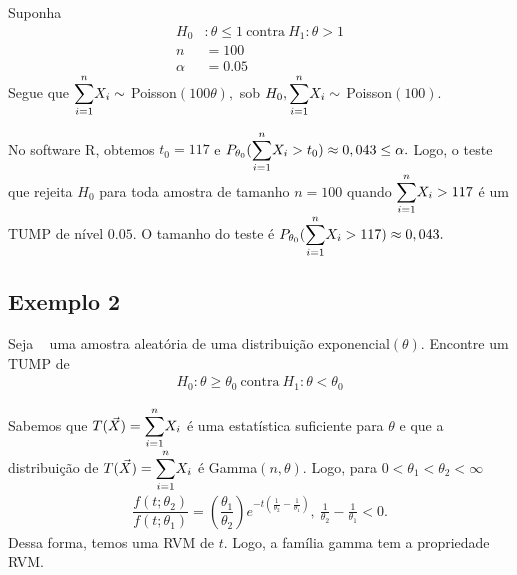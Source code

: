 \documentclass[12pt]{beamer}
\begin{document}
\begin{frame}{}
\begin{block}{}
\justifying
Suponha 
\begin{align*}
    H_{0}&:\theta\leq 1~\text{contra}~H_{1}:\theta> 1\\
    n&=100\\
    \alpha&=0.05
\end{align*}
Segue que ${\displaystyle \sum_{i=1}^{n}} X_{i}\sim~$Poisson$(100\theta),$ sob $H_{0}, {\displaystyle \sum_{i=1}^{n}} X_{i}\sim~$Poisson$(100).$
\end{block}
\end{frame}

\begin{frame}{}
\begin{block}{}
\justifying
No software R, obtemos $t_{0}=117$ e $P_{\theta_{0}}({\displaystyle \sum_{i=1}^{n}} X_{i}>t_{0})\approx 0,043\leq \alpha.$ Logo, o teste que rejeita $H_{0}$ para toda amostra de tamanho $n=100$ quando ${\displaystyle \sum_{i=1}^{n}} X_{i}>117$ é um TUMP de nível $0.05.$ O tamanho do teste é $P_{\theta_{0}}({\displaystyle \sum_{i=1}^{n}} X_{i}>117)\approx 0,043.$
\end{block}
\end{frame}

\subsection{Exemplo 2}
\begin{frame}{}
\begin{block}{}
\justifying
Seja \seqX~ uma amostra aleatória de uma distribuição exponencial$(\theta).$ Encontre um TUMP de 
\begin{align*}
    H_{0}:\theta\geq \theta_{0}~\text{contra}~H_{1}:\theta< \theta_{0}
\end{align*}
\end{block}
\pause
\begin{block}{}
\justifying
Sabemos que $T(\Vec{X})={\displaystyle \sum_{i=1}^{n}} X_{i}$ é uma estatística suficiente para $\theta$ e que a distribuição de $T(\Vec{X})={\displaystyle \sum_{i=1}^{n}} X_{i}$ é Gamma$(n,\theta).$ Logo, para $0<\theta_{1}<\theta_{2}<\infty$
\begin{align*}
    \dfrac{f(t;\theta_{2})}{f(t;\theta_{1})}=\left(\dfrac{\theta_{1}}{\theta_{2}}\right)e^{-t\left(\frac{1}{\theta_{2}}-\frac{1}{\theta_{1}}\right)},~\frac{1}{\theta_{2}}-\frac{1}{\theta_{1}}<0. 
\end{align*}
Dessa forma, temos uma RVM de $t.$ Logo, a família gamma tem a propriedade RVM. 
\end{block}
\end{frame}
\end{document}
